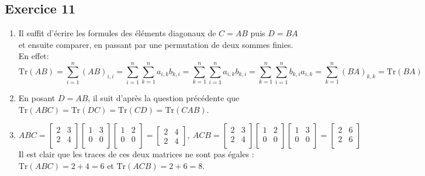 \documentclass{article}
\newcommand{\Tr}{\text{Tr}}
\begin{document}
\subsection*{Exercice 11}
\begin{enumerate}
    \item Il suffit d'écrire les formules des éléments diagonaux de $C=AB$ puis $D=BA$ et ensuite comparer, en passant par une permutation de deux sommes finies. \\
    En effet: 
    $$\Tr(AB) = \sum_{i=1}^{n} (AB)_{i,i} = 
    \sum_{i=1}^{n}\sum_{k=1}^{n}a_{i,k}b_{k,i}= \sum_{k=1}^{n}\sum_{i=1}^{n}a_{i,k}b_{k,i} = \sum_{k=1}^{n}\sum_{i=1}^{n}b_{k,i}a_{i,k} = \sum_{k=1}^{n} (BA)_{k,k} = \Tr(BA)$$
    \item En posant $D=AB$, il suit d'après la question précédente que $\Tr(ABC)=\Tr(DC)=\Tr(CD)=\Tr(CAB)$.
    \item  
    $ABC = \begin{bmatrix}
    2&3\\
    2&4\\
    \end{bmatrix}
    \begin{bmatrix}
    1&3\\
    0&0 \\
    \end{bmatrix} 
    \begin{bmatrix}
    1&2\\
    0&0 \\
    \end{bmatrix} = 
    \begin{bmatrix}
    2&4\\
    2&4 \end{bmatrix}, \ ACB = \begin{bmatrix}
    2&3\\
    2&4\\
    \end{bmatrix}  
    \begin{bmatrix}
    1&2\\
    0&0 \\
    \end{bmatrix} 
    \begin{bmatrix}
    1&3\\
    0&0 \\
    \end{bmatrix} = 
    \begin{bmatrix}
    2&6\\
    2&6\\
    \end{bmatrix}$ \newline \newline
Il est clair que les traces de ces deux matrices ne sont pas égales : $\Tr(ABC) = 2+4 = 6$ et $\Tr(ACB) = 2 + 6 = 8$.
\end{enumerate}
\end{document}
